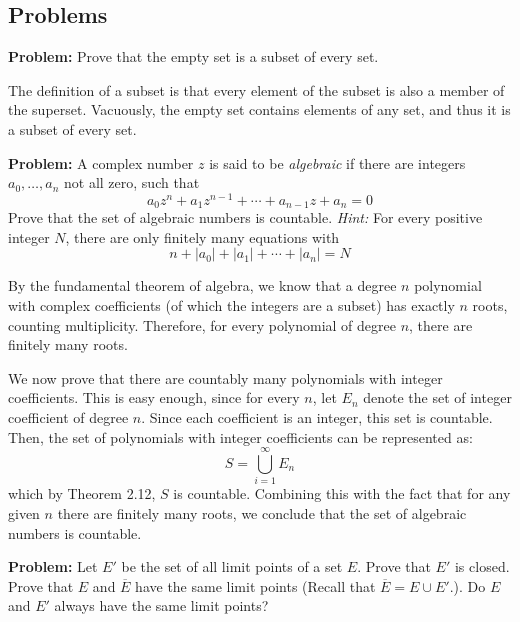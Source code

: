 \documentclass[10pt]{article}
\newenvironment{problem}{\textbf{Problem:}}{}
\begin{document}
	\subsection{Problems}
	\begin{problem}
		Prove that the empty set is a subset of every set. 
	\end{problem}

	\begin{solution}
		The definition of a subset is that every element of the subset is also a member of the superset. 
		Vacuously, the empty set contains elements of any set, and thus it is a subset of every set.  
	\end{solution}

	\begin{problem}
		A complex number \( z \) is said to be \textit{algebraic} if there are integers \( a_0, \dots, a_n \) not 
		all zero, such that
		 \[
		a_0z^{n} + a_1z^{n - 1} + \cdots + a_{n-1}z + a_n = 0
		\] 
		Prove that the set of algebraic numbers is countable. \textit{Hint:} For every positive 
		integer \( N \), there are only finitely many equations with 
		\[
		n + |a_0| + |a_1| + \cdots + |a_n| = N
		\] 
	\end{problem}

	\begin{solution}
		By the fundamental theorem of algebra, we know that a degree \( n \) polynomial with complex 
		coefficients (of which the integers are a subset) has exactly \( n \) roots, counting multiplicity. 
		Therefore, for every polynomial of degree \( n \), there are finitely many roots. 

		We now prove that there are countably many polynomials with integer coefficients. This is easy enough, 
		since for every \( n \), let \( E_n \) denote the set of integer coefficient of degree \( n \). Since 
		each coefficient is an integer, this set is countable. Then, the set of polynomials with integer coefficients 
		can be represented as:
		\[
		S = \bigcup_{i = 1}^{\infty}E_n
		\] 
		which by Theorem 2.12, \( S \) is countable. Combining this with the fact that for any given \( n \) there are
		finitely many roots, we conclude that the set of algebraic numbers is countable.  

	\end{solution}

	\begin{problem}
		Let \( E' \) be the set of all limit points of a set \( E \). Prove that \( E' \) is closed. Prove that 
		\( E \) and \( \overline E \) have the same limit points (Recall that \( \overline E = E \cup E'. \)). 
		Do \( E \) and \( E' \) always have the same limit points? 
	\end{problem}
\end{document}
